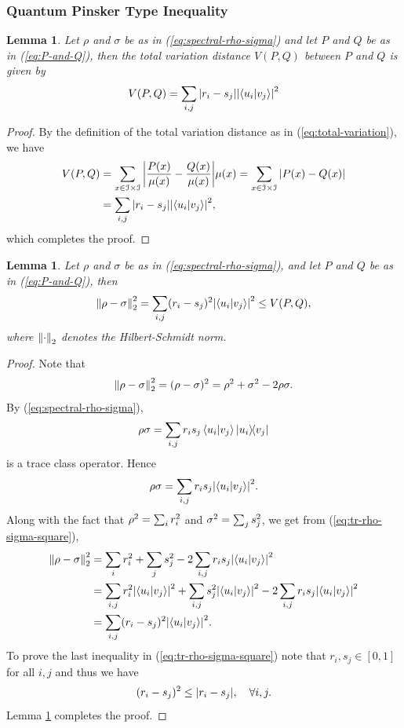 \documentclass[12pt,a4paper,oneside]{article}
\numberwithin{equation}{section}
\theoremstyle{definition}  %
\theoremstyle{plain}  %
\newtheorem{lem}[defn]{Lemma}
\theoremstyle{remark} %
\let\tr\relax
\DeclareMathOperator{\tr}{Tr}
\begin{document}
\subsubsection{Quantum Pinsker Type Inequality}
\begin{lem}\label{lem:total-variation}
 Let $\rho$ and $\sigma$ be as in (\ref{eq:spectral-rho-sigma})  and let $P$ and $Q$ be as in (\ref{eq:P-and-Q}), then the total variation distance $V(P,Q)$ between $P$ and $Q$ is given by  \begin{align}
     V(P,Q) = \sum_{i,j}\abs{r_i-s_j}\abs{\braket{u_i}{v_j}}^2
 \end{align}
\end{lem}
\begin{proof}
By the definition of the total variation distance as in  (\ref{eq:total-variation}), we have \begin{align*}
    V(P,Q) &= \sum_{x\in \mathcal{I}\times \mathcal{I}}\abs{\frac{P(x)}{\mu(x)}-\frac{Q(x)}{\mu(x)}}\mu(x) = \sum_{x\in \mathcal{I}\times \mathcal{I}}\abs{P(x)-Q(x)}\\
    &=\sum_{i,j}\abs{r_i-s_j}\abs{\braket{u_i}{v_j}}^2,
\end{align*}
which completes the proof.
\end{proof}
\begin{lem}\label{lem:tr-rho-sigma-square}
 Let $\rho$ and $\sigma$ be as in (\ref{eq:spectral-rho-sigma}), and let $P$ and $Q$ be as in (\ref{eq:P-and-Q}),  then \begin{align}
    \norm{\rho-\sigma}_2^2 = \sum_{i,j}(r_i-s_j)^2\abs{\braket{u_i}{v_j}}^2\leq V(P,Q),
 \end{align} 
  where $\norm{\cdot}_2$ denotes the Hilbert-Schmidt norm.
\end{lem}
\begin{proof}
Note that \begin{align}\label{eq:tr-rho-sigma-square}
    \norm{\rho-\sigma}_2^2 = \tr (\rho-\sigma)^2= \tr \rho^2+\tr\sigma^2 -2\tr \rho\sigma.
\end{align}
By (\ref{eq:spectral-rho-sigma}), \[\rho\sigma = \sum_{i,j}r_is_j\braket{u_i}{v_j}\ketbra{u_i}{v_j}\]
is a trace class operator. Hence \[\tr \rho\sigma = \sum_{i,j}r_is_j\abs{\braket{u_i}{v_j}}^2. \]
Along with the fact that $\tr\rho^2 = \sum_{i}r_i^2$ and $\tr \sigma^2 = \sum_j s_j^2$, we get from (\ref{eq:tr-rho-sigma-square}),\begin{align*}
    \norm{\rho-\sigma}_2^2 &=  \sum_{i}r_i^2+ \sum_j s_j^2-2\sum_{i,j}r_is_j\abs{\braket{u_i}{v_j}}^2\\
    &=\sum_{i,j}r_i^2\abs{\braket{u_i}{v_j}}^2+ \sum_{i,j} s_j^2\abs{\braket{u_i}{v_j}}^2-2\sum_{i,j}r_is_j\abs{\braket{u_i}{v_j}}^2\\
    &=\sum_{i,j} (r_i-s_j)^2\abs{\braket{u_i}{v_j}}^2.
\end{align*}
To prove the last inequality in (\ref{eq:tr-rho-sigma-square}) note that $r_i,s_j\in [0,1]$ for all $i,j$ and thus we have \[(r_i-s_j)^2\leq\abs{r_i-s_j}, \quad \forall i,j.\]  
Lemma \ref{lem:total-variation} completes the proof.
\end{proof}
\end{document}
